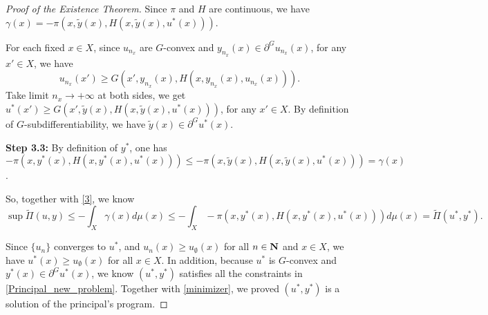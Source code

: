 \begin{proof}[Proof of the Existence Theorem]
	Since $\pi$ and $H$ are continuous, we have $ \gamma(x)= - \pi(x, \tilde{y}(x), H(x,\tilde{y}(x),u^*(x)))$.\medskip
	
	For each fixed $x\in X$, since $u_{n_x}$ are $G$-convex and $y_{n_x}(x) \in \partial^G u_{n_x}(x)$, for any $x' \in X$, we have $$u_{n_x}(x')\ge G(x', y_{n_x}(x),H(x,y_{n_x}(x),u_{n_x}(x))).$$ 
	Take limit $n_x \rightarrow +\infty$ at both sides, we get $u^*(x')\ge G(x', \tilde{y}(x),H(x,\tilde{y}(x),u^*(x)))$, for any $x'\in X$. By definition of $G$-subdifferentiability, we have $\tilde{y}(x)\in \partial^Gu^*(x)$. \medskip


	{\bf Step 3.3: } By definition of $y^*$, one has $$ -\pi(x, y^*(x), H(x,y^*(x),u^*(x)))\le   -\pi(x, \tilde{y}(x), H(x,\tilde{y}(x),u^*(x))) = \gamma(x)$$.
	
	So, together with \eqref{3}, we know 
	\begin{equation}\label{minimizer}
	\sup \tilde{\Pi}(u,y) \le - \int_{X}  \gamma(x) d\mu(x) \le - \int_{X}  - \pi(x, y^*(x), H(x,y^*(x),u^*(x))) d\mu(x) = \tilde{\Pi}(u^*,y^*).
	\end{equation}
	
	
	Since $\{u_n\}$ converges to $u^*$, and $u_n(x)\ge u_{\emptyset}(x)$ for all $n\in \mathbf{N}$ and $x \in X$, we have $u^*(x)\ge u_{\emptyset}(x)$ for all $x \in X$. In addition, because $u^*$ is $G$-convex and $y^*(x) \in \partial^G u^*(x)$, we know $(u^*, y^*)$ satisfies all the constraints in \eqref{Principal_new_problem}. Together with \eqref{minimizer}, we proved $(u^*,y^*)$ is a solution of the principal's program.
\end{proof}



%

















